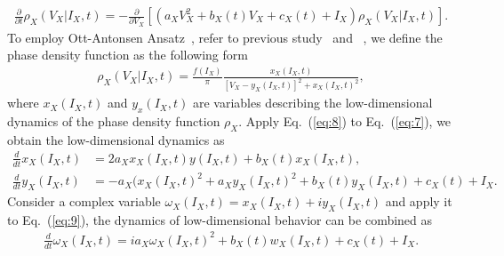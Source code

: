 \documentclass[10pt,letterpaper]{article}
\begin{document}
\begin{eqnarray}
\label{eq:7}
    \frac{\partial}{\partial t}\rho_{X}(V_{X}|I_{X},t)=-\frac{\partial}{\partial V_{X}}\left[ \left( a_{X}V_{X}^{2} + b_{X}(t)V_{X} + c_{X}(t) + I_{X}\right) \rho_{X}(V_{X}|I_{X},t) \right].
\end{eqnarray}
To employ Ott-Antonsen Ansatz~\cite{ott2008}, refer to previous study~\cite{montbrio2015} and ~\cite{akao2019}, we define the phase density function as the following form
\begin{eqnarray}
\label{eq:8}
    \rho_{X}(V_{X}|I_{X},t) = \frac{f(I_{X})}{\pi}\frac{x_{X}(I_{X},t)}{\left[ V_{X}-y_{X}(I_{X},t)\right]^{2} + x_{X}(I_{X},t)^{2}},
\end{eqnarray}
where $x_{X}(I_{X},t)$ and $y_{x}(I_{X},t)$ are variables describing the low-dimensional dynamics of the phase density function $\rho_{X}$. Apply Eq.~(\ref{eq:8}) to Eq.~(\ref{eq:7}), we obtain the low-dimensional dynamics as
\begin{subequations}
\label{eq:9}
\begin{align}
    \frac{d}{dt}x_{X}(I_{X},t) &= 2a_{X}x_{X}(I_{X},t)y(I_{X},t) + b_{X}(t)x_{X}(I_{X},t), \label{eq:9a} \\
    \frac{d}{dt}y_{X}(I_{X},t) &= -a_{X}(x_{X}(I_{X},t)^{2} + a_{X}y_{X}(I_{X},t)^{2} + b_{X}(t)y_{X}(I_{X},t) + c_{X}(t) + I_{X}. \label{eq:9b}
\end{align}
\end{subequations}
Consider a complex variable $\omega_{X}(I_{X},t)=x_{X}(I_{X},t)+iy_{X}(I_{X},t)$ and apply it to Eq.~(\ref{eq:9}), the dynamics of low-dimensional behavior can be combined as
\begin{eqnarray}
\label{eq:10}
    \frac{d}{dt}\omega_{X}(I_{X},t) = ia_{X}\omega_{X}(I_{X},t)^{2} + b_{X}(t)w_{X}(I_{X},t) + c_{X}(t) + I_{X}.
\end{eqnarray}
\end{document}
